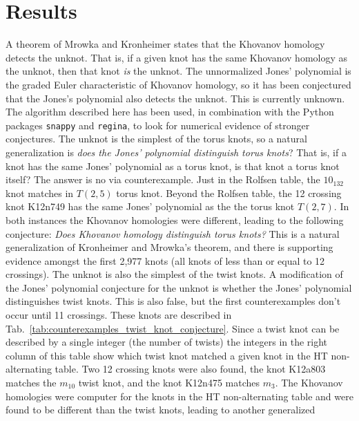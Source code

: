 \documentclass{article}
\theoremstyle{plain}
\begin{document}
    \section{Results}
        A theorem of Mrowka and Kronheimer states that the Khovanov homology
        detects the unknot. That is, if a given knot has the same Khovanov
        homology as the unknot, then that knot \textit{is} the unknot.
        The unnormalized Jones' polynomial is the graded Euler characteristic of
        Khovanov homology, so it has been conjectured that the Jones's
        polynomial also detects the unknot. This is currently unknown. The
        algorithm described here has been used, in combination with the
        Python packages \texttt{snappy} and \texttt{regina}, to look for
        numerical evidence of stronger conjectures. The unknot is the simplest
        of the torus knots, so a natural generalization is
        \textit{does the Jones' polynomial distinguish torus knots}? That is,
        if a knot has the same Jones' polynomial as a torus knot, is that knot
        a torus knot itself? The answer is no via counterexample. Just in the
        Rolfsen table, the $10_{132}$ knot matches in $T(2,5)$ torus knot.
        Beyond the Rolfsen table, the 12 crossing knot K12n749 has the same Jones'
        polynomial as the the torus knot $T(2,7)$. In both instances the
        Khovanov homologies were different, leading to the following conjecture:
        \textit{Does Khovanov homology distinguish torus knots?} This is a
        natural generalization of Kronheimer and Mrowka's theorem, and there is
        supporting evidence amongst the first 2,977 knots (all knots of less
        than or equal to 12 crossings).
        The unknot is also the simplest of the twist knots. A modification of
        the Jones' polynomial conjecture for the unknot is whether the Jones'
        polynomial distinguishes twist knots. This is also false, but the first
        counterexamples don't occur until 11 crossings. These knots are
        described in Tab.~\ref{tab:counterexamples_twist_knot_conjecture}. Since
        a twist knot can be described by a single integer (the number of twists)
        the integers in the right column of this table show which twist knot
        matched a given knot in the HT non-alternating table. Two 12 crossing
        knots were also found, the knot K12a803 matches the $m_{10}$ twist knot,
        and the knot K12n475 matches $m_{3}$. The Khovanov homologies were
        computer for the knots in the HT non-alternating table and were found
        to be different than the twist knots, leading to another generalized
\end{document}

